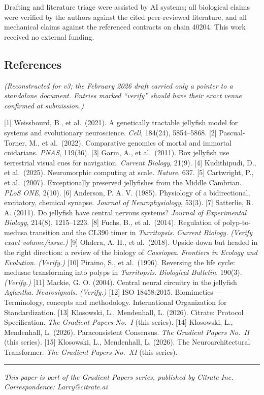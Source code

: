 Drafting and literature triage were assisted by AI systems; all
biological claims were verified by the authors against the cited
peer-reviewed literature, and all mechanical claims against the
referenced contracts on chain 40204. This work received no external
funding.

\subsection{References}\label{references}

\emph{(Reconstructed for v3; the February 2026 draft carried only a
pointer to a standalone document. Entries marked ``verify'' should have
their exact venue confirmed at submission.)}

{[}1{]} Weissbourd, B., et al.~(2021). A genetically tractable jellyfish
model for systems and evolutionary neuroscience. \emph{Cell}, 184(24),
5854--5868. {[}2{]} Pascual-Torner, M., et al.~(2022). Comparative
genomics of mortal and immortal cnidarians. \emph{PNAS}, 119(36).
{[}3{]} Garm, A., et al.~(2011). Box jellyfish use terrestrial visual
cues for navigation. \emph{Current Biology}, 21(9). {[}4{]} Kudithipudi,
D., et al.~(2025). Neuromorphic computing at scale. \emph{Nature}, 637.
{[}5{]} Cartwright, P., et al.~(2007). Exceptionally preserved
jellyfishes from the Middle Cambrian. \emph{PLoS ONE}, 2(10). {[}6{]}
Anderson, P. A. V. (1985). Physiology of a bidirectional, excitatory,
chemical synapse. \emph{Journal of Neurophysiology}, 53(3). {[}7{]}
Satterlie, R. A. (2011). Do jellyfish have central nervous systems?
\emph{Journal of Experimental Biology}, 214(8), 1215--1223. {[}8{]}
Fuchs, B., et al.~(2014). Regulation of polyp-to-medusa transition and
the CL390 timer in \emph{Turritopsis}. \emph{Current Biology.}
\emph{(Verify exact volume/issue.)} {[}9{]} Ohdera, A. H., et
al.~(2018). Upside-down but headed in the right direction: a review of
the biology of \emph{Cassiopea}. \emph{Frontiers in Ecology and
Evolution.} \emph{(Verify.)} {[}10{]} Piraino, S., et al.~(1996).
Reversing the life cycle: medusae transforming into polyps in
\emph{Turritopsis}. \emph{Biological Bulletin}, 190(3). \emph{(Verify.)}
{[}11{]} Mackie, G. O. (2004). Central neural circuitry in the jellyfish
\emph{Aglantha}. \emph{Neurosignals.} \emph{(Verify.)} {[}12{]} ISO
18458:2015. Biomimetics --- Terminology, concepts and methodology.
International Organization for Standardization. {[}13{]} Klosowski, L.,
Mendenhall, L. (2026). Citrate: Protocol Specification. \emph{The
Gradient Papers No.~I} (this series). {[}14{]} Klosowski, L.,
Mendenhall, L. (2026). Paraconsistent Consensus. \emph{The Gradient
Papers No.~II} (this series). {[}15{]} Klosowski, L., Mendenhall, L.
(2026). The Neuroarchitectural Transformer. \emph{The Gradient Papers
No.~XI} (this series).

\begin{center}\rule{0.5\linewidth}{0.5pt}\end{center}

\emph{This paper is part of the Gradient Papers series, published by
Citrate Inc.} \emph{Correspondence: Larry@citrate.ai}

